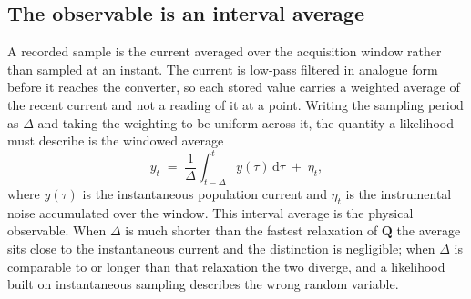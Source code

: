 \subsection*{The observable is an interval average}

A recorded sample is the current averaged over the acquisition window rather than sampled at an
instant. The current is low-pass filtered in analogue form before it reaches the converter, so
each stored value carries a weighted average of the recent current and not a reading of it at a
point. Writing the sampling period as $\Delta$ and taking the weighting to be uniform across it,
the quantity a likelihood must describe is the windowed average
\begin{equation}
  \bar{y}_t \;=\; \frac{1}{\Delta}\int_{t-\Delta}^{t} y(\tau)\,\mathrm{d}\tau \;+\; \eta_t,
  \label{eq:obs-avg}
\end{equation}
where $y(\tau)$ is the instantaneous population current and $\eta_t$ is the instrumental
noise accumulated over the window. This interval average is the physical observable. When
$\Delta$ is much shorter than the fastest relaxation of $\mathbf{Q}$ the average sits close
to the instantaneous current and the distinction is negligible; when $\Delta$ is comparable
to or longer than that relaxation the two diverge, and a likelihood built on instantaneous
sampling describes the wrong random variable.

